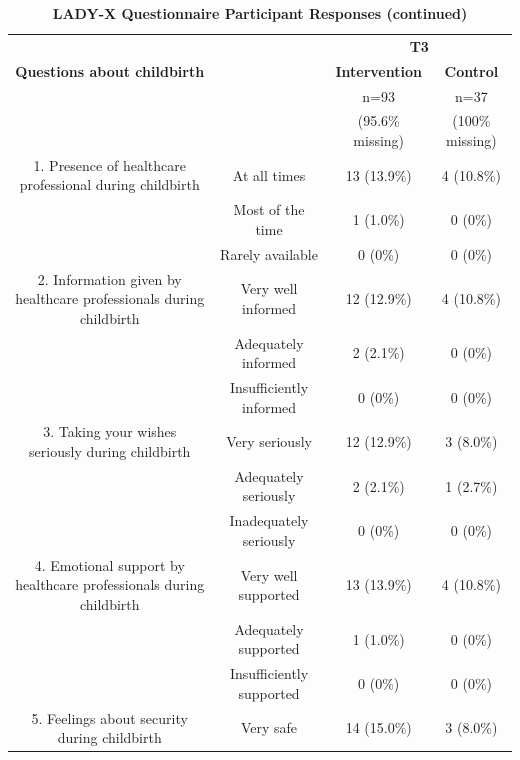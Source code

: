 \documentclass[12pt]{article}
\begin{document}
\captionsetup{justification=raggedright, singlelinecheck=false, skip=0pt, labelfont=bf}
\begin{landscape}
\begin{table}[htbp]
\centering
    \begin{threeparttable}
        \small
        \caption{\textbf{LADY-X Questionnaire Participant Responses (continued)}}
        \centering
        \begin{tabular}{cccc}
            \toprule
            & & \multicolumn{2}{c}{\textbf{T3}} \\ 
            \textbf{Questions about childbirth}  &   & \textbf{Intervention}  & \textbf{Control}  \\ 
            &  & n=93 & n=37\\
            & & (95.6\% missing) & (100\% missing) \\
            \midrule
            1. Presence of healthcare professional during childbirth  & At all times  & 13 (13.9\%) & 4 (10.8\%) \\ 
             & Most of the time  & 1 (1.0\%) & 0 (0\%) \\ 
             & Rarely available   & 0 (0\%) & 0 (0\%) \\ 
            \midrule
            2. Information given by healthcare professionals during childbirth  & Very well informed  & 12 (12.9\%) & 4 (10.8\%) \\ 
             & Adequately informed   & 2 (2.1\%)  & 0 (0\%) \\ 
             & Insufficiently informed   & 0 (0\%) & 0 (0\%) \\ 
            \midrule
            3. Taking your wishes seriously during childbirth & Very seriously   & 12 (12.9\%) & 3 (8.0\%) \\ 
             & Adequately seriously  & 2 (2.1\%)  & 1 (2.7\%) \\ 
             & Inadequately seriously  & 0 (0\%) & 0 (0\%) \\ 
            \midrule
            4. Emotional support by healthcare professionals during childbirth  & Very well supported  & 13 (13.9\%) & 4 (10.8\%) \\ 
             & Adequately supported   & 1 (1.0\%) & 0 (0\%) \\ 
             & Insufficiently supported   & 0 (0\%) & 0 (0\%) \\ 
            \midrule
            5. Feelings about security during childbirth  & Very safe  & 14 (15.0\%) & 3 (8.0\%) \\ 

\end{tabular}
\end{threeparttable}
\end{table}
\end{landscape}
\end{document}
